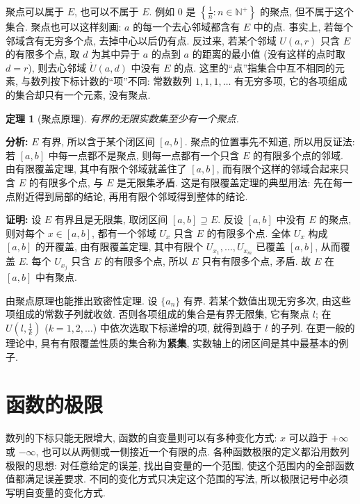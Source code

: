 \documentclass[UTF8,openany]{ctexbook}
\theoremstyle{chinesetextbook}
\newtheorem{theorem}{定理}[section]
\newenvironment{cnproof}{\par\indent\textbf{证明:} \ignorespaces}{\par}
\begin{document}
聚点可以属于 $E$, 也可以不属于 $E$. 例如 $0$ 是 $\displaystyle\left\{\frac1n:n\in\mathbb N^+\right\}$ 的聚点, 但不属于这个集合. 聚点也可以这样刻画: $a$ 的每一个去心邻域都含有 $E$ 中的点. 事实上, 若每个邻域含有无穷多个点, 去掉中心以后仍有点. 反过来, 若某个邻域 $U(a,r)$ 只含 $E$ 的有限多个点, 取 $d$ 为其中异于 $a$ 的点到 $a$ 的距离的最小值 (没有这样的点时取 $d=r$), 则去心邻域 $\mathring U(a,d)$ 中没有 $E$ 的点. 这里的“点”指集合中互不相同的元素, 与数列按下标计数的“项”不同: 常数数列 $1,1,1,\ldots$ 有无穷多项, 它的各项组成的集合却只有一个元素, 没有聚点.
\begin{theorem}[聚点原理]
有界的无限实数集至少有一个聚点.
\end{theorem}
\par\indent\textbf{分析:} $E$ 有界, 所以含于某个闭区间 $[a,b]$. 聚点的位置事先不知道, 所以用反证法: 若 $[a,b]$ 中每一点都不是聚点, 则每一点都有一个只含 $E$ 的有限多个点的邻域. 由有限覆盖定理, 其中有限个邻域就盖住了 $[a,b]$, 而有限个这样的邻域合起来只含 $E$ 的有限多个点, 与 $E$ 是无限集矛盾. 这是有限覆盖定理的典型用法: 先在每一点附近得到局部的结论, 再用有限个邻域得到整体的结论.
\begin{cnproof}
设 $E$ 有界且是无限集, 取闭区间 $[a,b]\supseteq E$. 反设 $[a,b]$ 中没有 $E$ 的聚点, 则对每个 $x\in[a,b]$, 都有一个邻域 $U_x$ 只含 $E$ 的有限多个点. 全体 $U_x$ 构成 $[a,b]$ 的开覆盖, 由有限覆盖定理, 其中有限个 $U_{x_1},\ldots,U_{x_m}$ 已覆盖 $[a,b]$, 从而覆盖 $E$. 每个 $U_{x_j}$ 只含 $E$ 的有限多个点, 所以 $E$ 只有有限多个点, 矛盾. 故 $E$ 在 $[a,b]$ 中有聚点.
\end{cnproof}
由聚点原理也能推出致密性定理. 设 $\{a_n\}$ 有界. 若某个数值出现无穷多次, 由这些项组成的常数子列就收敛. 否则各项组成的集合是有界无限集, 它有聚点 $l$; 在 $\displaystyle U\left(l,\frac1k\right)$ ($k=1,2,\ldots$) 中依次选取下标递增的项, 就得到趋于 $l$ 的子列. 在更一般的理论中, 具有有限覆盖性质的集合称为\textbf{紧集}, 实数轴上的闭区间是其中最基本的例子.
\section{函数的极限}
数列的下标只能无限增大, 函数的自变量则可以有多种变化方式: $x$ 可以趋于 $+\infty$ 或 $-\infty$, 也可以从两侧或一侧接近一个有限的点. 各种函数极限的定义都沿用数列极限的思想: 对任意给定的误差, 找出自变量的一个范围, 使这个范围内的全部函数值都满足误差要求. 不同的变化方式只决定这个范围的写法, 所以极限记号中必须写明自变量的变化方式.
\end{document}
